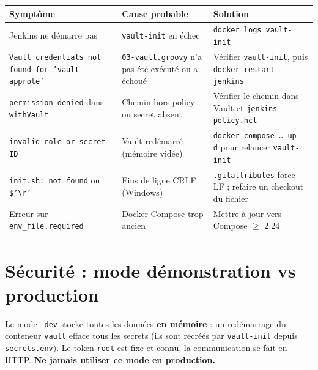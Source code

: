 \documentclass[11pt,a4paper]{article}
\begin{document}
\begin{center}
\small
\begin{tabularx}{\linewidth}{>{\raggedright\arraybackslash}p{4.2cm} >{\raggedright\arraybackslash}X >{\raggedright\arraybackslash}X}
\toprule
\textbf{Symptôme} & \textbf{Cause probable} & \textbf{Solution} \\
\midrule
Jenkins ne démarre pas & \texttt{vault-init} en échec & \texttt{docker logs vault-init} \\
\texttt{Vault credentials not found for 'vault-approle'} & \texttt{03-vault.groovy} n'a pas été exécuté ou a échoué & Vérifier \texttt{vault-init}, puis \texttt{docker restart jenkins} \\
\texttt{permission denied} dans \texttt{withVault} & Chemin hors policy ou secret absent & Vérifier le chemin dans Vault et \texttt{jenkins-policy.hcl} \\
\texttt{invalid role or secret ID} & Vault redémarré (mémoire vidée) & \texttt{docker compose \ldots{} up -d} pour relancer \texttt{vault-init} \\
\texttt{init.sh: not found} ou \texttt{\$'\textbackslash r'} & Fins de ligne CRLF (Windows) & \texttt{.gitattributes} force LF ; refaire un checkout du fichier \\
Erreur sur \texttt{env\_file.required} & Docker Compose trop ancien & Mettre à jour vers Compose $\geq$ 2.24 \\
\bottomrule
\end{tabularx}
\end{center}

\section{Sécurité : mode démonstration vs production}

\begin{attention}
Le mode \texttt{-dev} stocke toutes les données \textbf{en mémoire} : un redémarrage du
conteneur \texttt{vault} efface tous les secrets (ils sont recréés par
\texttt{vault-init} depuis \texttt{secrets.env}). Le token \texttt{root} est fixe et
connu, la communication se fait en HTTP. \textbf{Ne jamais utiliser ce mode en
production.}
\end{attention}
\end{document}
